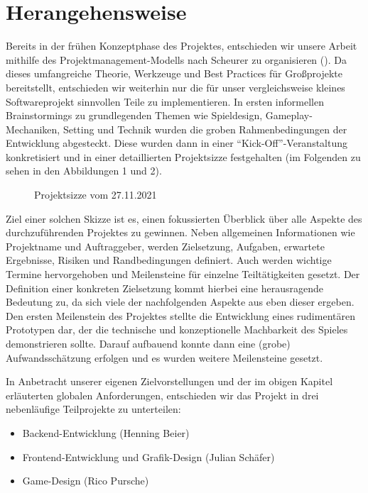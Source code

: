 
\section{Herangehensweise}
Bereits in der frühen Konzeptphase des Projektes, entschieden wir unsere Arbeit mithilfe des Projektmanagement-Modells nach Scheurer zu organisieren (\textcite{scheurer}). Da dieses umfangreiche Theorie, Werkzeuge und Best Practices für Großprojekte bereitstellt, entschieden wir weiterhin nur die für unser vergleichsweise kleines Softwareprojekt sinnvollen Teile zu implementieren.
In ersten informellen Brainstormings zu grundlegenden Themen wie Spieldesign, Gameplay-Mechaniken, Setting und Technik wurden die groben Rahmenbedingungen der Entwicklung abgesteckt. Diese wurden dann in einer \enquote{Kick-Off}-Veranstaltung konkretisiert und in einer detaillierten Projektsizze festgehalten (im Folgenden zu sehen in den Abbildungen 1 und 2).
\begin{figure}[H]
    \centering
    \caption{Projektsizze vom 27.11.2021}
\end{figure}
Ziel einer solchen Skizze ist es, einen fokussierten Überblick über alle Aspekte des durchzuführenden Projektes zu gewinnen. Neben allgemeinen Informationen wie Projektname und Auftraggeber, werden Zielsetzung, Aufgaben, erwartete Ergebnisse, Risiken und Randbedingungen definiert. Auch werden wichtige Termine hervorgehoben und Meilensteine für einzelne Teiltätigkeiten gesetzt. Der Definition einer konkreten Zielsetzung kommt hierbei eine herausragende Bedeutung zu, da sich viele der nachfolgenden Aspekte aus eben dieser ergeben. 
\newpage
Den ersten Meilenstein des Projektes stellte die Entwicklung eines rudimentären Prototypen dar, der die technische und konzeptionelle Machbarkeit des Spieles demonstrieren sollte. Darauf aufbauend konnte dann eine (grobe) Aufwandsschätzung erfolgen und es wurden weitere Meilensteine gesetzt.

In Anbetracht unserer eigenen Zielvorstellungen und der im obigen Kapitel erläuterten globalen Anforderungen, entschieden wir das Projekt in drei nebenläufige Teilprojekte zu unterteilen: 
\begin{itemize}
    \item Backend-Entwicklung (Henning Beier)
    \item Frontend-Entwicklung und Grafik-Design (Julian Schäfer)
    \item Game-Design (Rico Pursche)
\end{itemize}

